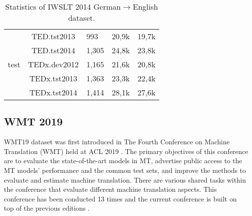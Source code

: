 \begin{table}[h]
\begin{tabular}{@{}cclll@{}}
        \multirow{5}{*}{test}                             & TED.tst2013                                             & 993                                 & 20,9k                           & 19,7k \\
                                                          & TED.tst2014                                             & 1,305                               & 24,8k                           & 23,8k \\
                                                          & TEDx.dev2012                                            & 1,165                               & 21,6k                           & 20,8k \\
                                                          & TEDx.tst2013                                            & 1,363                               & 23,3k                           & 22,4k \\
                                                          & TEDx.tst2014                                            & 1,414                               & 28,1k                           & 27,6k \\ \bottomrule
    \end{tabular}
    \caption{Statistics of IWSLT 2014 German$\rightarrow$English dataset.}
    \label{tab:iwslt14stat}
\end{table}

\subsection{WMT 2019}
WMT19 dataset was first introduced in The Fourth Conference on Machine Translation (WMT) held at ACL 2019 . The primary objectives of this conference are to evaluate the state-of-the-art models in MT, advertise public access to the MT models' performance and the common test sets, and improve the methods to evaluate and estimate machine translation. There are various shared tasks within the conference that evaluate different machine translation aspects. This conference has been conducted 13 times and the current conference is built on top of the previous editions .

